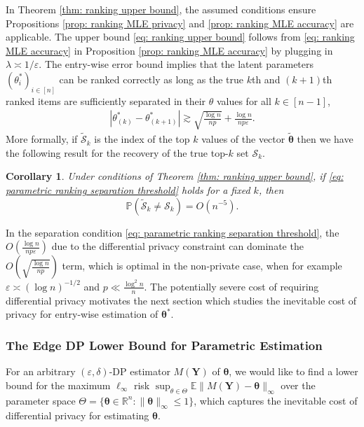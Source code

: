\documentclass[letterpaper,12pt]{article}
\numberwithin{equation}{section}
\theoremstyle{plain}
\numberwithin{Theorem}{section}
\newtheorem{corollary}{Corollary}
\numberwithin{corollary}{section}
\numberwithin{proposition}{section}
\numberwithin{Lemma}{section}
{
	\theoremstyle{definition}
	\newtheorem{Definition}{Definition}
	\newtheorem{example}{Example}
	\numberwithin{example}{section}
	\newtheorem{fact}{Fact}
	\numberwithin{fact}{section}
	\newtheorem{remark}{Remark}
}
\newcommand{\1}{\mathbbm{1}}
\def\bth{{\boldsymbol{\theta}}}
\def\Pr{\mathbb P}
\def\R{{\mathbb R}}
\def\E{\mathbb{E}}
\begin{document}
In Theorem \ref{thm: ranking upper bound}, the assumed conditions ensure Propositions \ref{prop: ranking MLE privacy} and \ref{prop: ranking MLE accuracy} are applicable. The upper bound \eqref{eq: ranking upper bound} follows from  \eqref{eq: ranking MLE accuracy} in Proposition \ref{prop: ranking MLE accuracy} by plugging in $\lambda \asymp 1/\varepsilon$. 
The entry-wise error bound implies that the latent parameters $(\theta^*_i)_{i \in [n]}$ can be ranked correctly as long as the true $k$th and $(k+1)$th ranked items are sufficiently separated in their $\theta$ values for all $k \in [n-1]$, 
\begin{align}\label{eq: parametric ranking separation threshold}
	|\theta^*_{(k)} - \theta^*_{(k+1)}| \gtrsim \sqrt{\frac{\log n}{np}} + \frac{\log n}{np\varepsilon}. 
\end{align}
More formally, if $\widetilde{\mathcal S}_k$ is the index of the top $k$ values of the vector $\tilde \bth$ then we have the following result for the recovery of the true top-$k$ set $\mathcal{S}_k$.
\begin{corollary}\label{thm: parametric-ranking-upper-bound}
	Under conditions of Theorem \ref{thm: ranking upper bound}, if \eqref{eq: parametric ranking separation threshold} holds for a fixed $k$, then
	$$
	\Pr(\widetilde{\mathcal S}_k \neq \mathcal{S}_k) = O(n^{-5}).
	$$
\end{corollary}
In the separation condition \eqref{eq: parametric ranking separation threshold}, the $O\left(\frac{\log n}{np\varepsilon}\right)$ due to the differential privacy constraint can dominate the $O(\sqrt{\frac{\log n}{np}})$ term, which is optimal in the non-private case, when for example $\varepsilon \asymp (\log n)^{-1/2}$ and $p \ll \frac{\log^2 n}{n}$. The potentially severe cost of requiring differential privacy motivates the next section which studies the inevitable cost of privacy for entry-wise estimation of $\bth^*$.


\subsubsection{The Edge DP Lower Bound for Parametric Estimation}
\label{sec: ranking estimation lower bound}

For an arbitrary $(\varepsilon, \delta)$-DP estimator $M(\bm Y)$ of $\bth$, we would like to find a lower bound for the maximum $\ell_\infty$ risk $\sup_{\theta \in \Theta} \E\|M(\bm Y) - \bth\|_\infty$ over the parameter space $\Theta = \{\bth \in \R^n: \|\bth\|_\infty \leq 1\}$, which captures the inevitable cost of differential privacy for estimating $\bth$.
\end{document}
